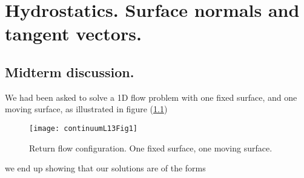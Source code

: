 %
%

\chapter{Hydrostatics.  Surface normals and tangent vectors.}
\label{chap:continuumL13}
{}
\date{Mar 2, 2012}

\beginArtWithToc


%

\section{Midterm discussion.}

We had been asked to solve a 1D flow problem with one fixed surface, and one moving surface, as illustrated in figure (\ref{fig:continuumL13:continuumL13Fig1})
\begin{figure}[htp]
   \centering
   \texttt{[image: continuumL13Fig1]}
   \caption{Return flow configuration.  One fixed surface, one moving surface.}\label{fig:continuumL13:continuumL13Fig1}
\end{figure}

we end up showing that our solutions are of the forms

